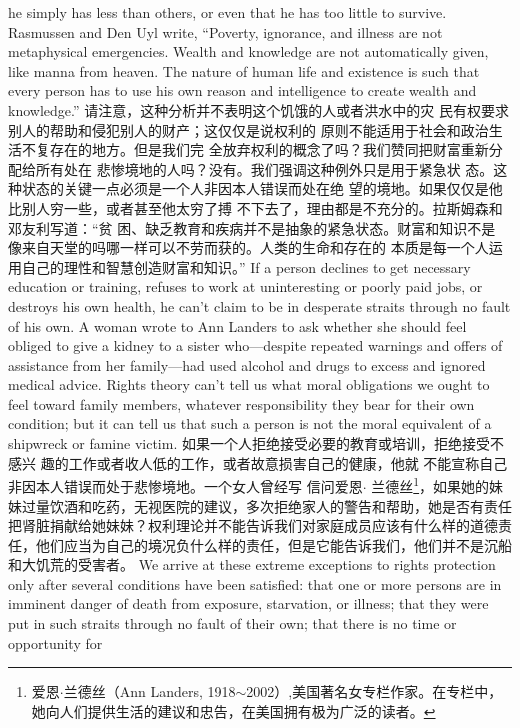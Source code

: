 \begin{paracol}{2}
he simply has less than others, or even that he has too little to
survive. Rasmussen and Den Uyl write, ``Poverty, ignorance,
and illness are not metaphysical emergencies. Wealth and
knowledge are not automatically given, like manna from
heaven. The nature of human life and existence is such that
every person has to use his own reason and intelligence to create
wealth and knowledge.''
\switchcolumn
请注意，这种分析并不表明这个饥饿的人或者洪水中的灾
民有权要求别人的帮助和侵犯别人的财产；这仅仅是说权利的
原则不能适用于社会和政治生活不复存在的地方。但是我们完
全放弃权利的概念了吗？我们赞同把财富重新分配给所有处在
悲惨境地的人吗？没有。我们强调这种例外只是用于紧急状
态。这种状态的关键一点必须是一个人非因本人错误而处在绝
望的境地。如果仅仅是他比别人穷一些，或者甚至他太穷了搏
不下去了，理由都是不充分的。拉斯姆森和邓友利写道：“贫
困、缺乏教育和疾病并不是抽象的紧急状态。财富和知识不是
像来自天堂的吗哪一样可以不劳而获的。人类的生命和存在的
本质是每一个人运用自己的理性和智慧创造财富和知识。”
\switchcolumn*
If a person declines to get necessary education or training, refuses to work at uninteresting or poorly paid jobs, or destroys
his own health, he can't claim to be in desperate straits through
no fault of his own. A woman wrote to Ann Landers to ask
whether she should feel obliged to give a kidney to a sister
who---despite repeated warnings and offers of assistance from
her family---had used alcohol and drugs to excess and ignored
medical advice. Rights theory can't tell us what moral obligations we ought to feel toward family members, whatever responsibility they bear for their own condition; but it can tell us
that such a person is not the moral equivalent of a shipwreck or
famine victim.
\switchcolumn
如果一个人拒绝接受必要的教育或培训，拒绝接受不感兴
趣的工作或者收人低的工作，或者故意损害自己的健康，他就
不能宣称自己非因本人错误而处于悲惨境地。一个女人曾经写
信问爱恩$\cdot$ 兰德丝\footnote{爱恩$\cdot$兰德丝（Ann  Landers, 1918$\sim$2002）,美国著名女专栏作家。在专栏中，她向人们提供生活的建议和忠告，在美国拥有极为广泛的读者。}，如果她的妹妹过量饮酒和吃药，无视医院的建议，多次拒绝家人的警告和帮助，她是否有责任把肾脏捐献给她妹妹？权利理论并不能告诉我们对家庭成员应该有什么样的道德责任，他们应当为自己的境况负什么样的责任，但是它能告诉我们，他们并不是沉船和大饥荒的受害者。
\switchcolumn*
We arrive at these extreme exceptions to rights protection
only after several conditions have been satisfied: that one or
more persons are in imminent danger of death from exposure, starvation, or illness; that they were put in such straits through
no fault of their own; that there is no time or opportunity for

\end{paracol}
